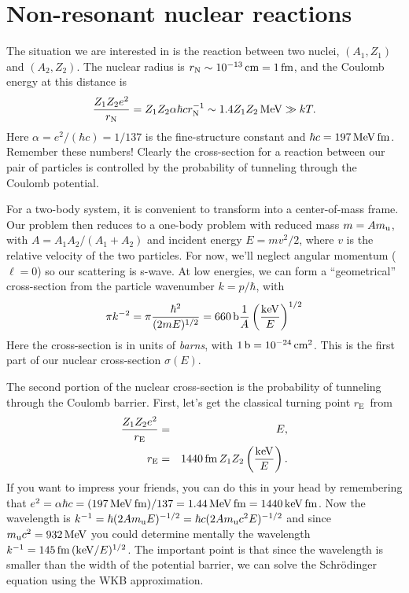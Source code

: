 
\chapter{Non-resonant nuclear reactions}
\newcommand{\rn}{\ensuremath{r_{\mathrm{N}}}}
\newcommand{\re}{\ensuremath{r_{\mathrm{E}}}}
\newcommand{\barn}{\ensuremath{\mathrm{b}}}
\newcommand{\EG}{\ensuremath{E_{\mathrm{G}}}}
\newcommand{\Epk}{\ensuremath{E_{\mathrm{pk}}}}

The situation we are interested in is the reaction between two nuclei, $(A_{1},Z_{1})$ and $(A_{2},Z_{2})$.  The nuclear radius is $\rn\sim10^{-13}\nsp\cm = 1\nsp\fermi$, and the Coulomb energy at this distance is
\begin{equation}\label{e.cb}
\frac{Z_{1}Z_{2}e^{2}}{\rn} = Z_{1}Z_{2}\alpha \hbar c \rn^{-1} \sim 1.4 Z_{1}Z_{2}\nsp\MeV\gg kT.
\end{equation}
Here $\alpha = e^{2}/(\hbar c) = 1/137$ is the fine-structure constant and $\hbar c = 197 \,\mathrm{M}\mathrm{eV}\,\mathrm{fm}$.  Remember these numbers!  Clearly the cross-section for a reaction between our pair of particles is controlled by the probability of tunneling through the Coulomb potential.

For a two-body system, it is convenient to transform into a center-of-mass frame.  Our problem then reduces to a one-body problem with reduced mass $m = Am_\mathrm{u}$, with $A=A_{1}A_{2}/(A_{1}+A_{2})$ and incident energy $E = m v^{2}/2$, where $v$ is the relative velocity of the two particles.  For now, we'll neglect angular momentum ($\ell = 0$) so our scattering is s-wave.
At low energies, we can form a ``geometrical'' cross-section from the particle wavenumber $k = p/\hbar$, with
\begin{equation}\label{e.geo}
\pi k^{-2} = \pi\frac{\hbar^{2}}{(2mE)^{1/2}} = 660\nsp\barn\frac{1}{A}\left(\frac{\keV}{E}\right)^{1/2}
\end{equation}
Here the cross-section is in units of \emph{barns}, with $1\nsp\barn = 10^{-24}\nsp\cm^{2}$.  This is the first part of our nuclear cross-section $\sigma(E)$. 

The second portion of the nuclear cross-section is the probability of tunneling through the Coulomb barrier.  First, let's get the classical turning point \re\ from
\begin{eqnarray}
\frac{Z_{1}Z_{2}e^{2}}{\re} &=& E,\nonumber\\
\re &=& 1440\nsp\fermi\nsp Z_{1}Z_{2}\left(\frac{\keV}{E}\right).
\end{eqnarray}
If you want to impress your friends, you can do this in your head by remembering that $e^{2} = \alpha \hbar c = (197\,\mathrm{M}\mathrm{eV}\,\mathrm{fm})/137 = 1.44\,\mathrm{M}\mathrm{eV}\,\mathrm{fm} = 1440\,\mathrm{k}\mathrm{eV}\,\mathrm{fm}$.  Now the wavelength is $k^{-1} = \hbar(2Am_\mathrm{u} E)^{-1/2} = \hbar c (2Am_\mathrm{u} c^{2} E)^{-1/2}$ and since $m_\mathrm{u} c^{2} = 932\,\mathrm{M}\mathrm{eV}$ you could determine mentally the wavelength $k^{-1} = 145\,\mathrm{fm}\,(\mathrm{k}\mathrm{eV}/E)^{1/2}$. The important point is that since the wavelength is smaller than the width of the potential barrier, we can solve the Schr\"odinger equation using the WKB approximation.

